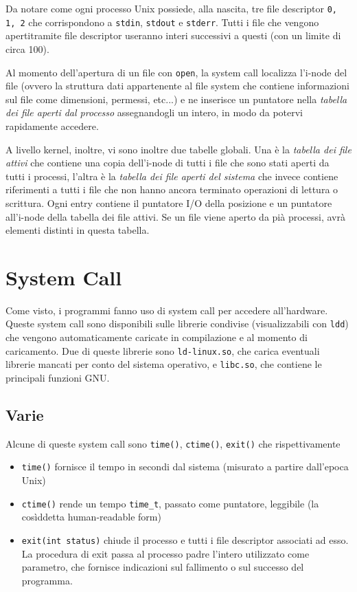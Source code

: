 \documentclass[11pt]{article}
\begin{document}
Da notare come ogni processo Unix possiede, alla nascita, tre file descriptor \verb|0, 1, 2| che corrispondono a \verb|stdin|, \verb|stdout| e \verb|stderr|. Tutti i file che vengono apertitramite file descriptor useranno interi successivi a questi (con un limite di circa 100).

Al momento dell'apertura di un file con \verb|open|, la system call localizza l'i-node del file (ovvero la struttura dati appartenente al file system che contiene informazioni sul file come dimensioni, permessi, etc...) e ne inserisce un puntatore nella \textit{tabella dei file aperti dal processo} assegnandogli un intero, in modo da potervi rapidamente accedere.

A livello kernel, inoltre, vi sono inoltre due tabelle globali. Una è la \textit{tabella dei file attivi} che contiene una copia dell'i-node di tutti i file che sono stati aperti da tutti i processi, l'altra è la \textit{tabella dei file aperti del sistema} che invece contiene riferimenti a tutti i file che non hanno ancora terminato operazioni di lettura o scrittura. Ogni entry contiene il puntatore I/O della posizione e un puntatore all'i-node della tabella dei file attivi. Se un file viene aperto da pià processi, avrà elementi distinti in questa tabella.

\section{System Call}

Come visto, i programmi fanno uso di system call per accedere all'hardware. Queste system call sono disponibili sulle librerie condivise (visualizzabili con \verb|ldd|) che vengono automaticamente caricate in compilazione e al momento di caricamento. Due di queste librerie sono \verb|ld-linux.so|, che carica eventuali librerie mancati per conto del sistema operativo, e \verb|libc.so|, che contiene le principali funzioni GNU.

\subsection{Varie}

Alcune di queste system call sono \verb|time()|, \verb|ctime()|, \verb|exit()| che rispettivamente
\begin{itemize}
    \item \verb|time()| fornisce il tempo in secondi dal sistema (misurato a partire dall'epoca Unix)
    \item \verb|ctime()| rende un tempo \verb|time_t|, passato come puntatore, leggibile (la cosìddetta human-readable form)
    \item \verb|exit(int status)| chiude il processo e tutti i file descriptor associati ad esso. La procedura di exit passa al processo padre l'intero utilizzato come parametro, che fornisce indicazioni sul fallimento o sul successo del programma.
\end{itemize}
\end{document}
